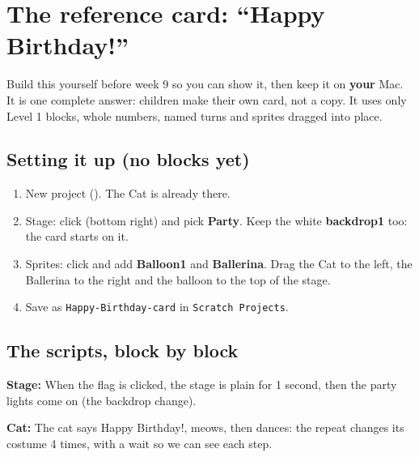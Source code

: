 \documentclass[track=junior,level=1,teacher]{kidscode}
\newenvironment{refscript}[2]{\par\needspace{8\baselineskip}\noindent\textbf{\color{kcaccent}#1:} #2\par\smallskip\begin{center}\begin{scratch}[scale=0.8]}{\end{scratch}\end{center}}
\begin{document}
\section{The reference card: \enquote{Happy Birthday!}}
Build this yourself before week 9 so you can show it, then keep it on \textbf{your} Mac. It is one
complete answer: children make their own card, not a copy. It uses only Level 1 blocks, whole
numbers, named turns and sprites dragged into place.

\subsection{Setting it up (no blocks yet)}
\begin{enumerate}[itemsep=2pt]
  \item New project (). The Cat is already there.
  \item Stage: click  (bottom right) and pick \textbf{Party}. Keep the white
        \textbf{backdrop1} too: the card starts on it.
  \item Sprites: click  and add \textbf{Balloon1} and \textbf{Ballerina}.
        Drag the Cat to the left, the Ballerina to the right and the balloon to the top of the stage.
  \item Save as \texttt{Happy-Birthday-card} in \texttt{Scratch Projects}.
\end{enumerate}

\subsection{The scripts, block by block}
\begin{refscript}{Stage}{When the flag is clicked, the stage is plain for 1 second, then the party lights come on (the backdrop change).}
\end{refscript}

\begin{refscript}{Cat}{The cat says Happy Birthday!, meows, then dances: the repeat changes its costume 4 times, with a wait so we can see each step.}
\end{refscript}
\end{document}

